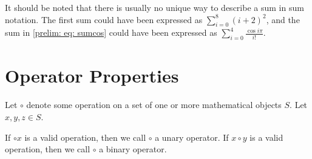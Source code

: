 \documentclass[../proofs.tex]{subfiles}
\begin{document}
  It should be noted that there is usually no unique way to describe a sum in sum
  notation. The first sum could have been expressed as $\sum_{i=0}^{8}{(i+2)^2}$,
  and the sum in \ref{prelim: eq: sumcos} could have been expressed as
  $\sum_{i=0}^{4}{ \frac{\cos{i\pi}} {i!} }.$

  \section{Operator Properties}
  \newcommand{\op}{\circ}
  Let $\op$ denote some operation on a set of one or more mathematical
  objects $S$. Let $x, y, z \in S$.

  If $\op x$ is a valid operation, then we call $\op$ a unary operator. If $x \op y$
  is a valid operation, then we call $\op$ a binary operator.  



\end{document}
